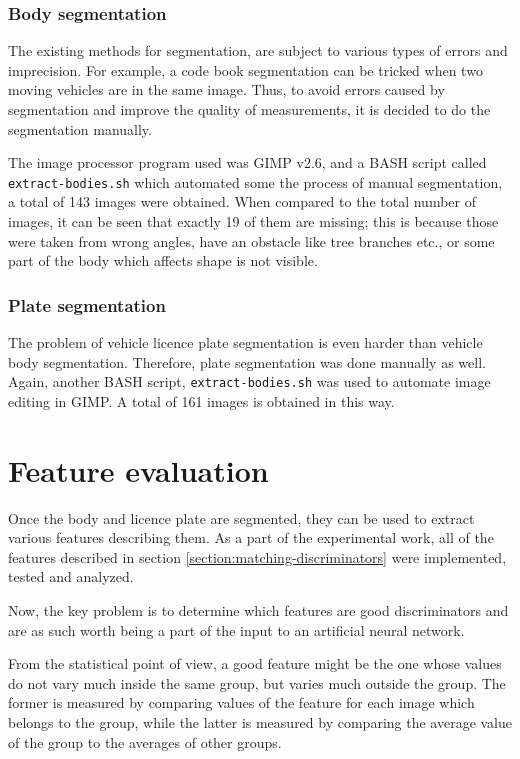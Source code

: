 \documentclass[times, utf8, zavrsni]{fer}
\begin{document}
\subsubsection{Body segmentation}

The existing methods for segmentation, are subject to various types of errors
and imprecision. For example, a code book segmentation can be tricked when two
moving vehicles are in the same image. Thus, to avoid errors caused by
segmentation and improve the quality of measurements, it is decided to do the
segmentation manually.

The image processor program used was GIMP v2.6, and a BASH script called
\texttt{extract-bodies.sh} which automated some the process of manual
segmentation, a total of 143 images were obtained. When compared to the total
number of images, it can be seen that exactly 19 of them are missing; this is
because those were taken from wrong angles, have an obstacle like tree branches
etc., or some part of the body which affects shape is not visible.


\subsubsection{Plate segmentation}
The problem of vehicle licence plate segmentation is even harder than vehicle
body segmentation. Therefore, plate segmentation was done manually as well.
Again, another BASH script, \texttt{extract-bodies.sh} was used to automate
image editing in GIMP. A total of 161 images is obtained in this way.

\section{Feature evaluation}

Once the body and licence plate are segmented, they can be used to extract
various features describing them. As a part of the experimental work, all of the
features described in section \ref{section:matching-discriminators} were
implemented, tested and analyzed.

Now, the key problem is to determine which features are good discriminators and
are as such worth being a part of the input to an artificial neural network.

From the statistical point of view, a good feature might be the one whose values
do not vary much inside the same group, but varies much outside the group. The
former is measured by comparing values of the feature for each image which
belongs to the group, while the latter is measured by comparing the average
value of the group to the averages of other groups.
\end{document}
